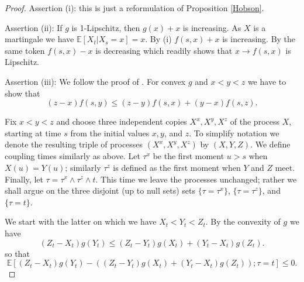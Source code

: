 \documentclass[11pt,a4paper]{article}%
\def\E{{\mathbb E}}
\numberwithin{equation}{section}
\begin{document}
\begin{proof}
Assertion (i): this is just a reformulation of Proposition \ref{Hobson}.

Assertion (ii): If $g$ is 1-Lipschitz, then $g(x) +x$ is increasing. As $X$ is a martingale we have $\E [X_t|X_s=x] = x$. By (i) $f(s,x) + x$ is increasing. By the same token $f(s,x) - x$ is decreasing which readily shows that $x \to f(s,x)$ is Lipschitz.

Assertion (iii): We follow the proof of \cite[Theorem 3.1]{Ho98c}.
For convex $g$ and $x < y < z$ we have to show that
\begin{equation}\label{convex}
(z-x) f(s,y) \le (z-y)f(s,x) + (y-x) f(s,z).
\end{equation}

Fix $x < y < z$ and choose three independent copies $X^x, X^y,X^z$ of the process $X$, starting at time $s$ from the initial values $x,y$, and $z$. To simplify notation we denote the resulting triple of processes $\left(  {X^x},X^y,{X^z} \right)$ by $(X,Y,Z)$. We define coupling times
similarly as above. Let $\tau^x$ be the first moment $u > s$ when $X(u) = Y(u)$; similarly $\tau^z$ is defined as the first moment when $Y$ and $Z$ meet. Finally, let $ \tau = \tau^x \wedge \tau^z \wedge t$. 
This time we leave the processes unchanged; rather we shall argue on the three disjoint (up to null sets) sets $\{\tau = \tau^x\}$, $\{\tau = \tau^z\}$, and $\{\tau = t\}$.

We start with the latter on which we have $X_t < Y_t < Z_t$.
By the convexity of $g$ we have
\begin{equation}\label{convexrandom}
(Z_t-X_t) g(Y_t) \le (Z_t-Y_t) g(X_t) + (Y_t-X_t) g(Z_t).
\end{equation}
so that
\begin{equation}\label{convexexp}
\E\left[(Z_t-X_t) g(Y_t) - \left( (Z_t-Y_t) g(X_t) + (Y_t-X_t)g(Z_t)\right);\tau = t\right] \le 0.
\end{equation}


\end{proof}
\end{document}
